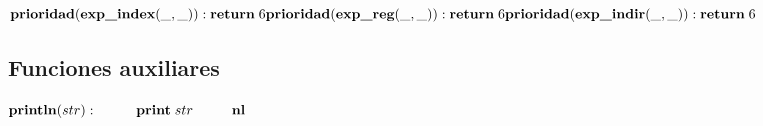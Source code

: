 \begin{math}
    \textbf{prioridad}(\textbf{exp\_index}(\_,\_)): \textbf{return} \; 6 \\
    \textbf{prioridad}(\textbf{exp\_reg}(\_,\_)): \textbf{return} \; 6 \\
    \textbf{prioridad}(\textbf{exp\_indir}(\_,\_)): \textbf{return} \; 6
\end{math}

\subsection{Funciones auxiliares}

\begin{math}
    \textbf{println}(str): \\
        \phantom{---} \textbf{print} \; str \\
        \phantom{---} \textbf{nl}
\end{math}
